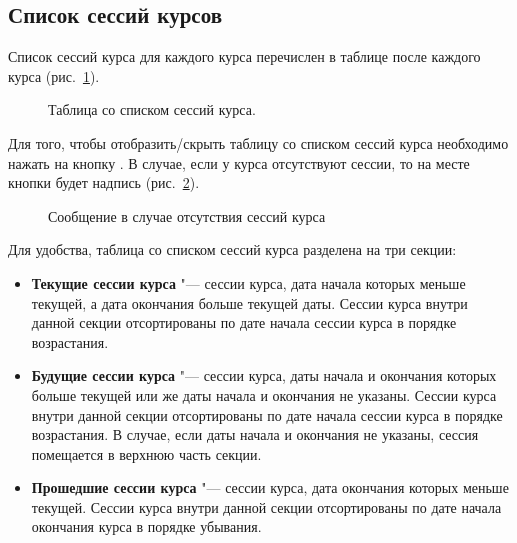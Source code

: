 \subsection{Список сессий курсов}
\label{course_session:course_session_list}
	Список сессий курса для каждого курса перечислен в таблице после каждого курса (рис.~\ref{img:course_session:course_session_table}).
	\begin{figure}[H]
		\caption{Таблица со списком сессий курса.}
		\label{img:course_session:course_session_table}
	\end{figure}
	
	Для того, чтобы отобразить/скрыть таблицу со списком сессий курса необходимо нажать на кнопку . В случае, если у курса отсутствуют сессии, то на месте кнопки  будет надпись  (рис.~\ref{img:course_session:course_without_sessions}).
		\begin{figure}[H]
			\caption{Сообщение в случае отсутствия сессий курса}
			\label{img:course_session:course_without_sessions}
		\end{figure}
		
	Для удобства, таблица со списком сессий курса разделена на три секции:
	\begin{itemize}
		\item \textbf{Текущие сессии курса} "--- сессии курса, дата начала которых меньше текущей, а дата окончания больше текущей даты.
		Сессии курса внутри данной секции отсортированы по дате начала сессии курса в порядке возрастания.
		\item \textbf{Будущие сессии курса} "--- сессии курса, даты начала и окончания которых больше текущей или же даты начала и окончания не указаны.				Сессии курса внутри данной секции отсортированы по дате начала сессии курса в порядке возрастания.
		В случае, если даты начала и окончания не указаны, сессия помещается в верхнюю часть секции.
		\item \textbf{Прошедшие сессии курса} "--- сессии курса, дата окончания которых меньше текущей.
		Сессии курса внутри данной секции отсортированы по дате начала окончания курса в порядке убывания.
	\end{itemize}
		

